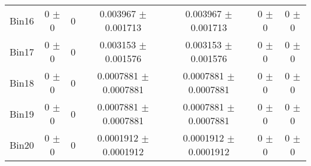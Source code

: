 \begin{tabular}{@{\extracolsep{4pt}}lcccccc@{}}
     Bin16 & 0 $\pm$ 0 & 0 & 0.003967 $\pm$ 0.001713 & 0.003967 $\pm$ 0.001713 & 0 $\pm$ 0 & 0 $\pm$ 0 \\ 
     Bin17 & 0 $\pm$ 0 & 0 & 0.003153 $\pm$ 0.001576 & 0.003153 $\pm$ 0.001576 & 0 $\pm$ 0 & 0 $\pm$ 0 \\ 
     Bin18 & 0 $\pm$ 0 & 0 & 0.0007881 $\pm$ 0.0007881 & 0.0007881 $\pm$ 0.0007881 & 0 $\pm$ 0 & 0 $\pm$ 0 \\ 
     Bin19 & 0 $\pm$ 0 & 0 & 0.0007881 $\pm$ 0.0007881 & 0.0007881 $\pm$ 0.0007881 & 0 $\pm$ 0 & 0 $\pm$ 0 \\ 
     Bin20 & 0 $\pm$ 0 & 0 & 0.0001912 $\pm$ 0.0001912 & 0.0001912 $\pm$ 0.0001912 & 0 $\pm$ 0 & 0 $\pm$ 0 \\ 
\hline\hline
  \end{tabular}
